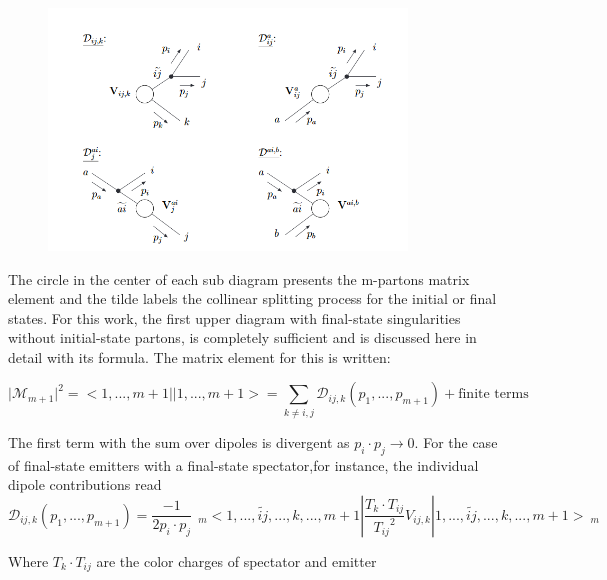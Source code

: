 \begin{figure}[h!]
\centering
\includegraphics[width=0.85\textwidth]{images/Intro/Dipole.png}
\end{figure}

The circle in the center of each sub diagram presents the m-partons matrix element and the tilde labels the collinear splitting process for the initial or final states.
For this work, the first upper diagram with final-state singularities without initial-state partons, is completely sufficient and is discussed here in detail with its formula.
The matrix element for this is written:

\begin{equation}
\vert {{\mathcal{M}}}_{m+1}  \vert^2 = < 1,...,m+1 || 1,...,m+1 > = \sum_{k \neq i,j} {{\mathcal{D}}}_{ij,k}(p_1,...,p_{m+1}) +\text{finite terms}
\end{equation}

The first term with the sum over dipoles is divergent as $ p_i \cdot p_j \rightarrow 0 $. 
For the case of final-state emitters with a final-state spectator,for instance, the individual dipole contributions read
\begin{equation}
 {{\mathcal{D}}}_{ij,k}(p_1,...,p_{m+1}) = \frac{-1}{2p_i \cdot p_j} \:\:_m<1,...,\tilde{ij},...,k,...,m+1 |\frac{T_k \cdot T_{ij}}{{T_{ij}}^2} V_{ij,k}| 1,...,\tilde{ij},...,k,...,m+1 >\:_m
\end{equation}

Where $ T_k \cdot T_{ij} $ are the color charges of spectator and emitter

